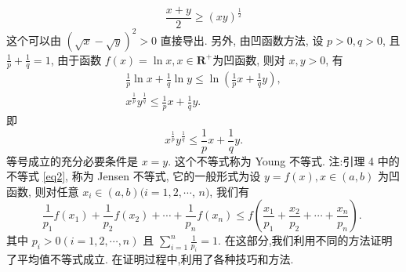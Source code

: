 $$
\frac{x+y}{2} \geqslant(x y)^{\frac{1}{2}}
$$
这个可以由 $(\sqrt{x}-\sqrt{y})^2>0$ 直接导出.
另外, 由凹函数方法, 设 $p>0, q>0$, 且 $\frac{1}{p}+\frac{1}{q}=1$, 由于函数 $f(x)= \ln x, x \in \mathbf{R}^{+}$为凹函数, 则对 $x, y>0$, 有
$$
\begin{gathered}
\frac{1}{p} \ln x+\frac{1}{q} \ln y \leqslant \ln \left(\frac{1}{p} x+\frac{1}{q} y\right), \\
x^{\frac{1}{p}} y^{\frac{1}{q}} \leqslant \frac{1}{p} x+\frac{1}{q} y .
\end{gathered}
$$
即
$$
x^{\frac{1}{p}} y^{\frac{1}{q}} \leqslant \frac{1}{p} x+\frac{1}{q} y .
$$
等号成立的充分必要条件是 $x=y$.
这个不等式称为 Young 不等式.
注:引理 4 中的不等式 \ref{eq2}, 称为 Jensen 不等式, 它的一般形式为设 $y=f(x), x \in(a, b)$ 为凹函数, 则对任意 $x_i \in(a, b)(i=1,2, \cdots$, $n)$, 我们有
$$
\frac{1}{p_1} f\left(x_1\right)+\frac{1}{p_2} f\left(x_2\right)+\cdots+\frac{1}{p_n} f\left(x_n\right) \leqslant f\left(\frac{x_1}{p_1}+\frac{x_2}{p_2}+\cdots+\frac{x_n}{p_n}\right) \text {. }
$$
其中 $p_i>0(i=1,2, \cdots, n)$ 且 $\sum_{i=1}^n \frac{1}{p_i}=1$.
在这部分,我们利用不同的方法证明了平均值不等式成立.
在证明过程中,利用了各种技巧和方法.


